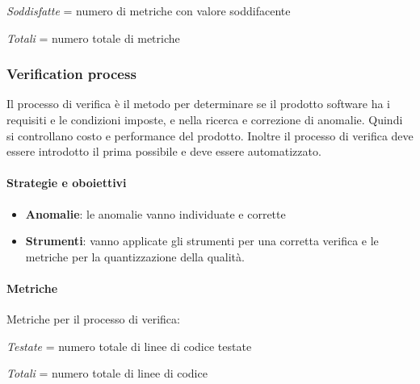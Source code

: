\textit{Soddisfatte} = numero di metriche con valore soddifacente

\textit{Totali} = numero totale di metriche
 
            \subsubsection{Verification process}
            Il processo di verifica è il metodo per determinare se il prodotto software ha i requisiti e le condizioni imposte, e nella ricerca e correzione di anomalie. Quindi si controllano costo e performance del prodotto. Inoltre il processo di verifica deve essere introdotto il prima possibile e deve essere automatizzato.
            
            \paragraph{Strategie e oboiettivi}
            \begin{itemize}
                \item \textbf{Anomalie}: le anomalie vanno individuate e corrette
                \item \textbf{Strumenti}: vanno applicate gli strumenti per una corretta verifica e le metriche per la quantizzazione della qualità.
            \end{itemize}
            
            \paragraph{Metriche}
            Metriche per il processo di verifica:
            
            \def\productquality{
                {   Code coverage,
                    $\frac{Testate}{Totali}$,
                    $ 75 \%$,
                    $ 100 \% $
                },
                {   Numero di test superati,
                    numero intero,
                    = numero totale di test,
                    = numero totale di test
                },
            }


\textit{Testate} = numero totale di linee di codice testate

\textit{Totali} = numero totale di linee di codice
            